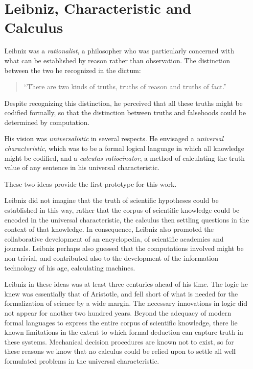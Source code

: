 \section{Leibniz, Characteristic and Calculus}

Leibniz was a \emph{rationalist}, a philosopher who was particularly
concerned with what can be established by reason rather than
observation. 
The distinction between the two he recognized in the dictum:

\begin{quote}
``There are two kinds of truths, truths of reason and truths of fact.''
\end{quote}

Despite recognizing this distinction, he perceived that all these
truths might be codified formally, so that the distinction between
truths and falsehoods could be determined by computation. 

His vision was \emph{universalistic} in several respects.
He envisaged a \emph{universal
  characteristic}, which was to be a
formal logical language in which all knowledge might be codified, and
a \emph{calculus ratiocinator}, a method
of calculating the truth value of any sentence in his universal
characteristic. 

These two ideas provide the first prototype for this work.

Leibniz did not imagine that the truth of scientific hypotheses could
be established in this way, rather that the corpus of scientific
knowledge could be encoded in the universal characteristic, the
calculus then settling questions in the context of that knowledge. 
In consequence, Leibniz also promoted the collaborative development of
an encyclopedia, of scientific academies and journals. 
Leibniz perhaps also guessed that the computations involved might be
non-trivial, and contributed also to the development of the
information technology of his age, calculating machines. 

Leibniz in these ideas was at least three centuries ahead of his time.
The logic he knew was essentially that of Aristotle, and fell short of
what is needed for the formalization of science by a wide margin. 
The necessary innovations in logic did not appear for another two
hundred years. 
Beyond the adequacy of modern formal languages to express the entire
corpus of scientific knowledge, there lie known limitations in the
extent to which formal deduction can capture truth in these systems. 
Mechanical decision procedures are known not to exist, so for these
reasons we know that no calculus could be relied upon to settle all
well formulated problems in the universal characteristic. 

